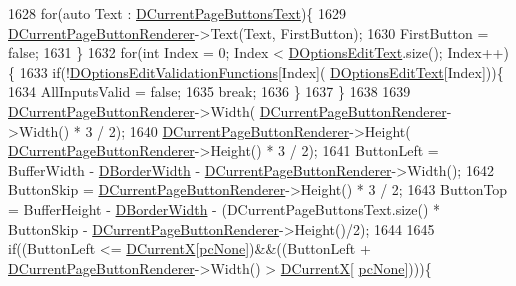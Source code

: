 \begin{DoxyCode}
1628     \textcolor{keywordflow}{for}(\textcolor{keyword}{auto} Text : \hyperlink{classCApplicationData_af04b7f5f8ba4e5c99c0a3530055fc15d}{DCurrentPageButtonsText})\{
1629         \hyperlink{classCApplicationData_abfe1743f2634b069ccc811db4a8733a8}{DCurrentPageButtonRenderer}->Text(Text, FirstButton);
1630         FirstButton = \textcolor{keyword}{false};
1631     \}
1632     \textcolor{keywordflow}{for}(\textcolor{keywordtype}{int} Index = 0; Index < \hyperlink{classCApplicationData_a7044dc34cbd9d6776e8ef79eb12b5ce4}{DOptionsEditText}.size(); Index++)\{
1633         \textcolor{keywordflow}{if}(!\hyperlink{classCApplicationData_ab76fa444142de66fdb058f390e01112c}{DOptionsEditValidationFunctions}[Index](
      \hyperlink{classCApplicationData_a7044dc34cbd9d6776e8ef79eb12b5ce4}{DOptionsEditText}[Index]))\{
1634             AllInputsValid = \textcolor{keyword}{false};
1635             \textcolor{keywordflow}{break};
1636         \}
1637     \}
1638     
1639     \hyperlink{classCApplicationData_abfe1743f2634b069ccc811db4a8733a8}{DCurrentPageButtonRenderer}->Width(
      \hyperlink{classCApplicationData_abfe1743f2634b069ccc811db4a8733a8}{DCurrentPageButtonRenderer}->Width() * 3 / 2);
1640     \hyperlink{classCApplicationData_abfe1743f2634b069ccc811db4a8733a8}{DCurrentPageButtonRenderer}->Height(
      \hyperlink{classCApplicationData_abfe1743f2634b069ccc811db4a8733a8}{DCurrentPageButtonRenderer}->Height() * 3 / 2);                            
1641     ButtonLeft = BufferWidth - \hyperlink{classCApplicationData_a566b69c72fa982c6ecf8e47dc21df489}{DBorderWidth} - 
      \hyperlink{classCApplicationData_abfe1743f2634b069ccc811db4a8733a8}{DCurrentPageButtonRenderer}->Width();
1642     ButtonSkip = \hyperlink{classCApplicationData_abfe1743f2634b069ccc811db4a8733a8}{DCurrentPageButtonRenderer}->Height() * 3 / 2;
1643     ButtonTop = BufferHeight - \hyperlink{classCApplicationData_a566b69c72fa982c6ecf8e47dc21df489}{DBorderWidth} - (DCurrentPageButtonsText.size() * ButtonSkip - 
      \hyperlink{classCApplicationData_abfe1743f2634b069ccc811db4a8733a8}{DCurrentPageButtonRenderer}->Height()/2);
1644     
1645     \textcolor{keywordflow}{if}((ButtonLeft <= \hyperlink{classCApplicationData_a1dc7ee482a39f7978c71365ac540f97a}{DCurrentX}[\hyperlink{GameDataTypes_8h_aafb0ca75933357ff28a6d7efbdd7602fa88767aa8e02c7b3192bbab4127b3d729}{pcNone}])&&((ButtonLeft + 
      \hyperlink{classCApplicationData_abfe1743f2634b069ccc811db4a8733a8}{DCurrentPageButtonRenderer}->Width() > \hyperlink{classCApplicationData_a1dc7ee482a39f7978c71365ac540f97a}{DCurrentX}[
      \hyperlink{GameDataTypes_8h_aafb0ca75933357ff28a6d7efbdd7602fa88767aa8e02c7b3192bbab4127b3d729}{pcNone}])))\{

\end{DoxyCode}
